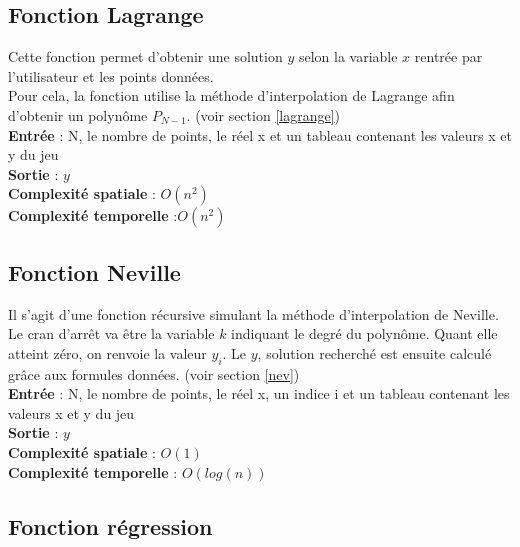 \documentclass[12pt,french,titlepage]{article}
\begin{document}
	\subsection{Fonction Lagrange}
	
	
	\medskip
	Cette fonction permet d'obtenir une solution $y$ selon la variable $x$ rentrée par l'utilisateur et les points données.\\
	Pour cela, la fonction utilise la méthode d'interpolation de Lagrange afin d'obtenir un polynôme $P_{N-1}$. (voir section \ref{lagrange})\\
	
	\textbf{Entrée} : N, le nombre de points, le réel x et un tableau contenant les valeurs x et y du jeu\\
	\textbf{Sortie} : $y$\\
	\textbf{Complexité spatiale} : $O(n^2)$\\
	\textbf{Complexité temporelle} :$O(n^2)$\\
	
	\subsection{Fonction Neville}
	
	\medskip
	Il s'agit d'une fonction récursive simulant la méthode d'interpolation de Neville. Le cran d'arrêt va être la variable $k$ indiquant le degré du polynôme. Quant elle atteint zéro, on renvoie la valeur $y_i$. Le $y$, solution recherché est ensuite calculé grâce aux formules données. (voir section \ref{nev})\\
	
	\textbf{Entrée} : N, le nombre de points, le réel x, un indice i et un tableau contenant les valeurs x et y du jeu\\
	\textbf{Sortie} : $y$\\
	\textbf{Complexité spatiale} : $O(1)$\\
	\textbf{Complexité temporelle} : $O(log(n)) $\\
	
	\subsection{Fonction régression}
	
	
\end{document}
